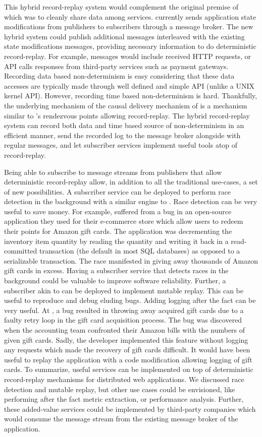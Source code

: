 This hybrid record-replay system would complement the original premise of
\synapse which was to cleanly share data among services. \synapse currently
sends application state modifications from publishers to subscribers through a
message broker. The new hybrid system could publish additional messages
interleaved with the existing state modifications messages, providing necessary
information to do deterministic record-replay. For example, messages would include
received HTTP requests, or API calls responses from third-party services such as
payment gateways. Recording data based non-determinism is easy considering that
these data accesses are typically made through well defined and simple API
(unlike a UNIX kernel API). However, recording time based non-determinism is hard.
Thankfully, the underlying mechanism of the causal delivery mechanism of \synapse
is a mechanism similar to \scribe's rendezvous points allowing record-replay.
The hybrid record-replay system can record both data and time based source
of non-determinism in an efficient manner, send the recorded log to the message
broker alongside with regular \synapse messages, and let subscriber services
implement useful tools atop of record-replay.

Being able to subscribe to message streams from publishers that allow
deterministic record-replay allow, in addition to all the traditional \synapse
use-cases, a set of new possibilities. A subscriber service can be deployed to
perform race detection in the background with a similar engine to \racepro.
Race detection can be very useful to save money. For example, \crowdtap suffered
from a bug in an open-source application they used for their e-commerce store
which allow users to redeem their points for Amazon gift cards.  The application
was decrementing the inventory item quantity by reading the quantity and writing
it back in a read-committed transaction (the default in most SQL databases) as
opposed to a serializable transaction. The race manifested in giving away
thousands of Amazon gift cards in excess. Having a subscriber service that
detects races in the background could be valuable to improve software
reliability.
Further, a subscriber akin to \dora can be deployed to implement mutable replay.
This can be useful to reproduce and debug eluding bugs. Adding logging after the
fact can be very useful. At \crowdtap, a bug resulted in throwing away acquired
gift cards due to a faulty retry loop in the gift card acquisition process.
The bug was discovered when the accounting team confronted their Amazon bills
with the numbers of given gift cards. Sadly, the developer implemented this
feature without logging any requests which made the recovery of gift cards
difficult. It would have been useful to replay the application with a code
modification allowing logging of gift cards.
To summarize, useful services can be implemented on top of deterministic
record-replay mechanisms for distributed web applications. We discussed race detection
and mutable replay, but other use cases could be envisioned, like performing
after the fact metric extraction, or performance analysis.
Further, these added-value services could be implemented by third-party
companies which would consume the message stream from the existing \synapse
message broker of the application.

